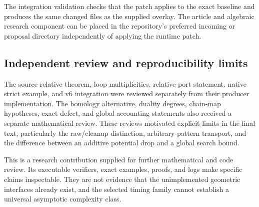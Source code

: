 The integration validation checks that the patch applies to the exact
baseline and produces the same changed files as the supplied overlay.
The article and algebraic research component can be placed in the repository's
preferred incoming or proposal directory independently of applying the
runtime patch.

\subsection{Independent review and reproducibility limits}

The source-relative theorem, loop multiplicities, relative-port statement,
native strict example, and v6 integration were reviewed separately from
their producer implementation. The homology alternative, duality degrees,
chain-map hypotheses, exact defect, and global accounting statements also
received a separate mathematical review. These reviews motivated explicit
limits in the final text, particularly the raw/cleanup distinction,
arbitrary-pattern transport, and the difference between an additive
potential drop and a global search bound.

This is a research contribution supplied for further mathematical and code
review. Its executable verifiers, exact examples, proofs, and logs make
specific claims inspectable. They are not evidence that the unimplemented
geometric interfaces already exist, and the selected timing family cannot
establish a universal asymptotic complexity class.

